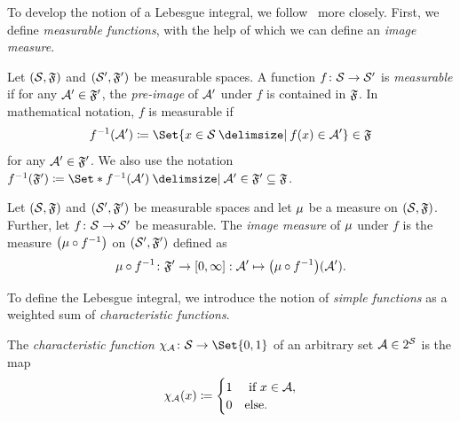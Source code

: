 To develop the notion of a Lebesgue integral, we follow~\cite{Klenke2014} more closely.
First, we define \emph{measurable functions}, with the help of which we can define an \emph{image measure}.
\begin{definition}%
	\label{def:pre-image and measurable functions}
	Let \( (\mathcal{S}, \mathfrak{F}) \) and \( (\mathcal{S}^\prime, \mathfrak{F}^\prime) \) be measurable spaces.
	A function \( f \colon \mathcal{S} \to \mathcal{S}^\prime \) is \emph{measurable} if for any \( \mathcal{A}^\prime \in \mathfrak{F}^\prime \), the \emph{pre-image} of \( \mathcal{A}^\prime \) under \( f \) is contained in \( \mathfrak{F} \).
	In mathematical notation, \( f \) is measurable if
	\begin{equation}
		f^{-1}(\Event) \coloneqq \Set{x \in \ASet \given f(x) \in \Event} \in \SigmaAlgebraSymbol
	\end{equation}
	for any \( \mathcal{A}^\prime \in \mathfrak{F}^\prime \).
	We also use the notation \( \PreImage{f}(\SigmaAlgebraSymbol^\prime) \coloneqq \Set*{\PreImage{f}(\Event) \given \Event \in \SigmaAlgebraSymbol^\prime} \subseteq \SigmaAlgebraSymbol \).
\end{definition}
\begin{definition}%
	\label{def:image measure}
	Let \( (\mathcal{S}, \mathfrak{F}) \) and \( (\mathcal{S}^\prime, \mathfrak{F}^\prime) \) be measurable spaces and let \( \mu \) be a measure on \( (\mathcal{S}, \mathfrak{F}) \).
	Further, let \( f \colon \mathcal{S} \to \mathcal{S}^\prime \) be measurable.
	The \emph{image measure} of \( \mu \) under \( f \) is the measure \( \bigl( \mu \circ f^{-1} \bigr) \) on \( (\mathcal{S}^\prime, \mathfrak{F}^\prime) \) defined as
	\begin{equation}
		\map{\Measure \circ f^{-1}}{\SigmaAlgebraSymbol^\prime}{\interval{\num{0}}{\infty}} : \mathcal{A}^\prime \mapsto \bigl(\Measure \circ f^{-1} \bigr)(\mathcal{A}^\prime).
	\end{equation}
\end{definition}
To define the Lebesgue integral, we introduce the notion of \emph{simple functions} as a weighted sum of \emph{characteristic functions}.
\begin{definition}%
	\label{def:characteristic function}
	The \emph{characteristic function} \( \map{\CharacteristicFunction{\mathcal{A}}}{\ASet\allowbreak}{\Set{\num{0}, \num{1}}} \) of an arbitrary set \( \mathcal{A} \in 2^{\mathcal{S}} \) is the map
	\begin{equation}
		\chi_{\mathcal{A}}(x) \coloneqq \begin{cases}
			\num{1} &\ \text{if}\ x \in \mathcal{A}, \\
			\num{0} & \text{else}.
		\end{cases}
	\end{equation}
\end{definition}
